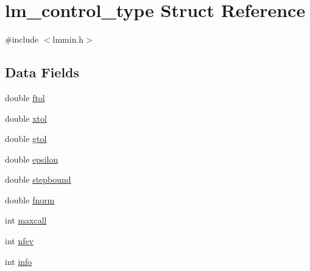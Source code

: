 \hypertarget{structlm__control__type}{
\section{lm\_\-control\_\-type Struct Reference}
\label{structlm__control__type}
}


{\ttfamily \#include $<$lmmin.h$>$}\subsection*{Data Fields}
\begin{DoxyCompactItemize}
\item 
double \hyperlink{structlm__control__type_a390ee918461a172e90481e8119a3d72d}{ftol}
\item 
double \hyperlink{structlm__control__type_af9d44a57a447e2c06ba3d46a489add1f}{xtol}
\item 
double \hyperlink{structlm__control__type_a6c5c61a7c6e1642628db21a31343094a}{gtol}
\item 
double \hyperlink{structlm__control__type_a01ac2c22cbc51e3a976a9ac8ae5a7903}{epsilon}
\item 
double \hyperlink{structlm__control__type_ac9780bfca8d97b88914ee2cbcad2c1e4}{stepbound}
\item 
double \hyperlink{structlm__control__type_ac28e9ebd141dfd714d5a47886d432bbe}{fnorm}
\item 
int \hyperlink{structlm__control__type_ab4ae043d134b2aed42e7f582a5477ccd}{maxcall}
\item 
int \hyperlink{structlm__control__type_ae4655b72dafdecff2d201b37db99a30d}{nfev}
\item 
int \hyperlink{structlm__control__type_a8861cf59bcef801a964cea58a6391297}{info}
\end{DoxyCompactItemize}


